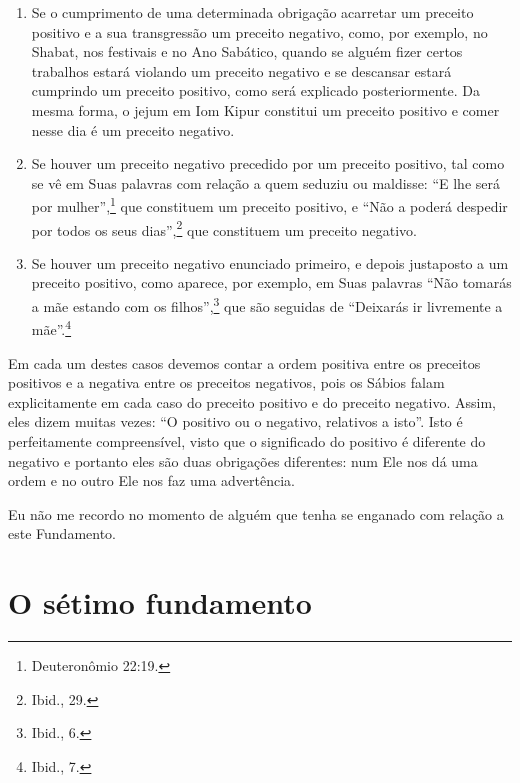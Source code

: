 \begin{enumerate}
\def\labelenumi{\arabic{enumi}.}
\item
  Se o cumprimento de uma determinada obrigação acarretar um preceito
  positivo e a sua transgressão um preceito negativo, como, por
  exemplo, no Shabat, nos festivais e no Ano Sabático, quando se alguém
  fizer certos trabalhos estará violando um preceito negativo e se
  descansar estará cumprindo um preceito positivo, como será explicado
  posteriormente. Da mesma forma, o jejum em Iom Kipur\starr{} constitui um
  preceito positivo e comer nesse dia é um preceito negativo.

\item
  Se houver um preceito negativo precedido por um preceito positivo,
  tal como se vê em Suas palavras com relação a quem seduziu ou
  maldisse: ``E lhe será por mulher'',\footnote{Deuteronômio 22:19.} que
  constituem um preceito positivo, e ``Não a poderá despedir por todos
  os seus dias'',\footnote{Ibid., 29.} que constituem um preceito negativo.

\item
  Se houver um preceito negativo enunciado primeiro, e depois
  justaposto a um preceito positivo, como aparece, por exemplo, em Suas
  palavras ``Não tomarás a mãe estando com os filhos'',\footnote{Ibid., 6.} que
  são seguidas de ``Deixarás ir livremente a mãe''.\footnote{Ibid., 7.}
\end{enumerate}

Em cada um destes casos devemos contar a ordem positiva entre os
preceitos positivos e a negativa entre os preceitos negativos, pois os
Sábios falam explicitamente em cada caso do preceito positivo e do preceito
negativo. Assim, eles dizem muitas vezes: ``O positivo ou o negativo,
relativos a isto''. Isto é perfeitamente compreensível, visto que o
significado do positivo é diferente do negativo e portanto eles são
duas obrigações diferentes: num Ele nos dá uma ordem e no outro Ele nos
faz uma advertência.

Eu não me recordo no momento de alguém que tenha se enganado com relação
a este Fundamento.

\chapter*{O sétimo fundamento}

